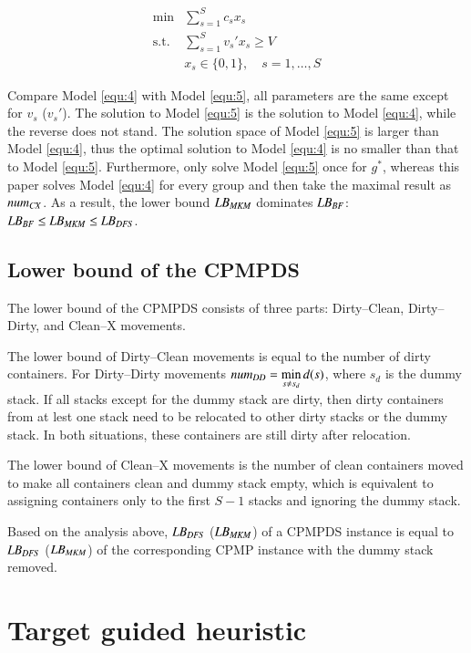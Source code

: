 \documentclass[review,3p,times,authoryear,12pt]{elsarticle}
\begin{document}
\begin{equation}
\label{equ:5}
\begin{array}{rl}
\min & \sum\limits_{s=1}^S c_s x_s\\
\mathrm{s.t.} &\sum\limits_{s=1}^S v_s' x_s\ge V\\
&x_s\in\{0,1\}, \quad s=1,\dots,S
\end{array}
\end{equation}

Compare Model \ref{equ:4} with Model \ref{equ:5}, all parameters are the same except for $v_s$ ($v_s'$). The solution to Model \ref{equ:5} is the solution to Model \ref{equ:4}, while the reverse does not stand. The solution space of Model \ref{equ:5} is larger than Model \ref{equ:4}, thus the optimal solution to Model \ref{equ:4} is no smaller than that to Model \ref{equ:5}. Furthermore, \cite{BF2012} only solve Model \ref{equ:5} once for $g^*$, whereas this paper solves Model \ref{equ:4} for every group and then take the maximal result as $\id{num}_\id{CX}$. As a result, the lower bound $\id{LB}_\id{MKM}$ dominates $\id{LB}_\id{BF}$: $\id{LB}_\id{BF}\le \id{LB}_\id{MKM}\le \id{LB}_\id{DFS}$.
\subsection{Lower bound of the CPMPDS}

The lower bound of the CPMPDS consists of three parts: Dirty--Clean, Dirty--Dirty, and Clean--X movements.

The lower bound of Dirty--Clean movements is equal to the number of dirty containers. For Dirty--Dirty movements $\id{num}_\id{DD}=\min\limits_{s\neq s_d} d(s)$, where $s_d$ is the dummy stack. If all stacks except for the dummy stack are dirty, then dirty containers from at lest one stack need to be relocated to other dirty stacks or the dummy stack. In both situations, these containers are still dirty after relocation.

The lower bound of Clean--X movements is the number of clean containers moved to make all containers clean and dummy stack empty, which is equivalent to assigning containers only to the first $S-1$ stacks and ignoring the dummy stack.

Based on the analysis above, $\id{LB}_\id{DFS}$ ($\id{LB}_\id{MKM}$) of a CPMPDS instance is equal to $\id{LB}_\id{DFS}$ ($\id{LB}_\id{MKM}$) of the corresponding CPMP instance with the dummy stack removed.

\section{Target guided heuristic}
\label{sec:heu}
\end{document}
